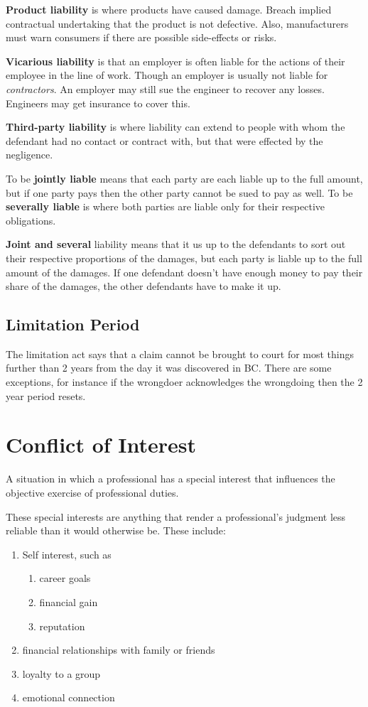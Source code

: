 \documentclass{article}
\begin{document}
\textbf{Product liability} is where products have caused damage. Breach implied contractual undertaking that the product is not defective. Also, manufacturers must warn consumers if there are possible side-effects or risks.

\textbf{Vicarious liability} is that an employer is often liable for the actions  of their employee in the line of work. Though an employer is usually not liable for \textit{contractors}. An employer may still sue the engineer to recover any losses. Engineers may get insurance to cover this.

\textbf{Third-party liability} is where liability can extend to people with whom the defendant had no contact or contract with, but that were effected by the negligence.

To be \textbf{jointly liable} means that each party are each liable up to the full amount, but if one party pays then the other party cannot be sued to pay as well. To be \textbf{severally liable} is where both parties are liable only for their respective obligations.  

\textbf{Joint and several} liability means that it us up to the defendants to sort out their respective proportions of the damages, but each party is liable up to the full amount of the damages. If  one defendant doesn't have enough money to pay their share of the damages, the other defendants have to make it up.

\subsection{Limitation Period}

The limitation act says that a claim cannot be brought to court for most things further than 2 years from the day it was discovered in BC. There are some exceptions, for instance if the wrongdoer acknowledges the wrongdoing then the 2 year period resets.


\section{Conflict of Interest}

A situation in which a professional has a special interest that influences the objective exercise of professional duties.

These special interests are anything that render a professional's judgment less reliable than it would otherwise be. These include: \begin{enumerate}
\item Self interest, such as \begin{enumerate}
\item career goals
\item financial gain
\item reputation
\end{enumerate}
\item financial relationships with family or friends
\item loyalty to a group
\item emotional connection
\end{enumerate}
\end{document}
